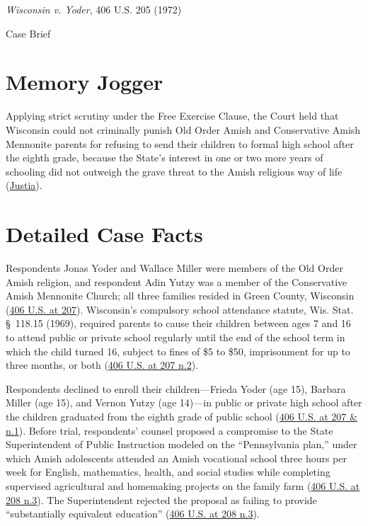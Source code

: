 \documentclass[12pt]{article}
\begin{document}
\begin{center}
{\LARGE \textit{Wisconsin v. Yoder}, 406 U.S. 205 (1972)\par}
\vspace{0.8em}
{\large Case Brief\par}
\end{center}
\vspace{1em}

\section{Memory Jogger}
Applying strict scrutiny under the Free Exercise Clause, the Court held that Wisconsin could not criminally punish Old Order Amish and Conservative Amish Mennonite parents for refusing to send their children to formal high school after the eighth grade, because the State's interest in one or two more years of schooling did not outweigh the grave threat to the Amish religious way of life (\href{https://supreme.justia.com/cases/federal/us/406/205/}{Justia}).

\section{Detailed Case Facts}
Respondents Jonas Yoder and Wallace Miller were members of the Old Order Amish religion, and respondent Adin Yutzy was a member of the Conservative Amish Mennonite Church; all three families resided in Green County, Wisconsin (\href{https://supreme.justia.com/cases/federal/us/406/205/}{406 U.S. at 207}). Wisconsin's compulsory school attendance statute, Wis. Stat. \S~118.15 (1969), required parents to cause their children between ages 7 and 16 to attend public or private school regularly until the end of the school term in which the child turned 16, subject to fines of \$5 to \$50, imprisonment for up to three months, or both (\href{https://supreme.justia.com/cases/federal/us/406/205/}{406 U.S. at 207 n.2}).

Respondents declined to enroll their children---Frieda Yoder (age 15), Barbara Miller (age 15), and Vernon Yutzy (age 14)---in public or private high school after the children graduated from the eighth grade of public school (\href{https://supreme.justia.com/cases/federal/us/406/205/}{406 U.S. at 207 \& n.1}). Before trial, respondents' counsel proposed a compromise to the State Superintendent of Public Instruction modeled on the ``Pennsylvania plan,'' under which Amish adolescents attended an Amish vocational school three hours per week for English, mathematics, health, and social studies while completing supervised agricultural and homemaking projects on the family farm (\href{https://supreme.justia.com/cases/federal/us/406/205/}{406 U.S. at 208 n.3}). The Superintendent rejected the proposal as failing to provide ``substantially equivalent education'' (\href{https://supreme.justia.com/cases/federal/us/406/205/}{406 U.S. at 208 n.3}).
\end{document}
